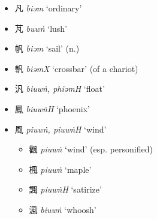\begin{itemize}
  \item {\Large{凡}} %
    \textit{biəm} `ordinary' %

  \item {\Large{芃}} %
    \textit{buwṅ} `lush' %

  \item {\Large{帆}} %
    \textit{biəm} `sail' (n.) %

  \item {\Large{軓}} %
    \textit{biəmX} 
    `crossbar' (of a chariot) %

  \item {\Large{汎}} %
    \textit{biuwṅ, phiəmH} `float' %

  \item {\Large{鳳}} %
    \textit{biuwṅH} `phoenix' %

  \item {\Large{風}} %
    \textit{piuwṅ, piuwṅH} `wind' %
\begin{itemize}
  \item {\Large{飌}} %
    \textit{piuwṅ} `wind' (esp. personified)%



  \item {\Large{楓}} %
    \textit{piuwṅ} `maple' %

  \item {\Large{諷}} %
    \textit{piuwṅH} `satirize' %

  \item {\Large{渢}} %
    \textit{biuwṅ} `whoosh' %
\end{itemize}
\end{itemize}

